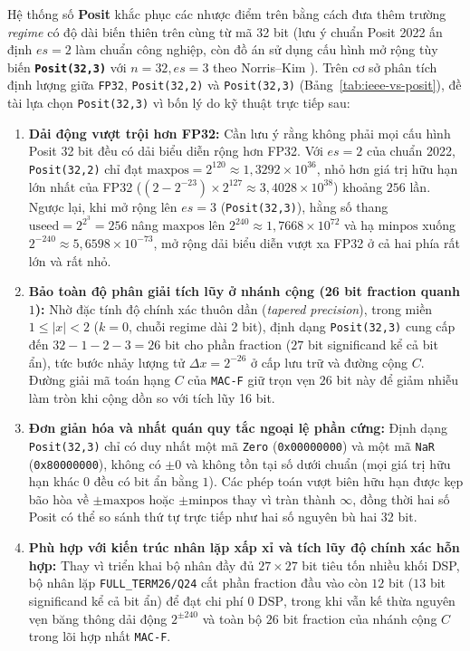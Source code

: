 Hệ thống số \textbf{Posit} \cite{gustafson2017posit,positstandard2022} khắc phục
các nhược điểm trên bằng cách đưa thêm trường \textit{regime} có độ dài biến thiên
trên cùng từ mã 32 bit (lưu ý chuẩn Posit 2022 ấn định $es=2$ làm chuẩn công
nghiệp, còn đồ án sử dụng cấu hình mở rộng tùy biến \textbf{\texttt{Posit(32,3)}}
với $n=32, es=3$ theo Norris--Kim \cite{norris2021iterativeposit}). Trên cơ sở
phân tích định lượng giữa \texttt{FP32}, \texttt{Posit(32,2)} và \texttt{Posit(32,3)}
(Bảng~\ref{tab:ieee-vs-posit}), đề tài lựa chọn \texttt{Posit(32,3)} vì bốn lý do
kỹ thuật trực tiếp sau:
\begin{enumerate}
  \item \textbf{Dải động vượt trội hơn FP32:} Cần lưu ý rằng không phải mọi cấu
        hình Posit 32 bit đều có dải biểu diễn rộng hơn FP32. Với $es=2$ của
        chuẩn 2022, \texttt{Posit(32,2)} chỉ đạt $\mathrm{maxpos}=2^{120}\approx
        1{,}3292\times 10^{36}$, nhỏ hơn giá trị hữu hạn lớn nhất của FP32
        ($(2-2^{-23})\times 2^{127}\approx 3{,}4028\times 10^{38}$) khoảng $256$ lần.
        Ngược lại, khi mở rộng lên $es=3$ (\texttt{Posit(32,3)}), hằng số thang
        $\mathrm{useed}=2^{2^3}=256$ nâng $\mathrm{maxpos}$ lên $2^{240}\approx
        1{,}7668\times 10^{72}$ và hạ $\mathrm{minpos}$ xuống $2^{-240}\approx
        5{,}6598\times 10^{-73}$, mở rộng dải biểu diễn vượt xa FP32 ở cả hai
        phía rất lớn và rất nhỏ.
  \item \textbf{Bảo toàn độ phân giải tích lũy ở nhánh cộng (26 bit fraction quanh $1$):}
        Nhờ đặc tính độ chính xác thuôn dần (\textit{tapered precision}), trong
        miền $1 \le |x| < 2$ ($k=0$, chuỗi regime dài 2 bit), định dạng
        \texttt{Posit(32,3)} cung cấp đến $32 - 1 - 2 - 3 = 26$ bit cho phần
        fraction ($27$ bit significand kể cả bit ẩn), tức bước nhảy lượng tử
        $\Delta x = 2^{-26}$ ở cấp lưu trữ và đường cộng $C$. Đường giải mã
        toán hạng $C$ của \texttt{MAC-F} giữ trọn vẹn $26$ bit này để giảm
        nhiễu làm tròn khi cộng dồn so với tích lũy 16 bit.
  \item \textbf{Đơn giản hóa và nhất quán quy tắc ngoại lệ phần cứng:} Định dạng
        \texttt{Posit(32,3)} chỉ có duy nhất một mã \texttt{Zero} (\texttt{0x00000000})
        và một mã \texttt{NaR} (\texttt{0x80000000}), không có $\pm 0$ và không
        tồn tại số dưới chuẩn (mọi giá trị hữu hạn khác $0$ đều có bit ẩn bằng $1$).
        Các phép toán vượt biên hữu hạn được kẹp bão hòa về $\pm\mathrm{maxpos}$
        hoặc $\pm\mathrm{minpos}$ thay vì tràn thành $\infty$, đồng thời hai số
        Posit có thể so sánh thứ tự trực tiếp như hai số nguyên bù hai 32 bit.
  \item \textbf{Phù hợp với kiến trúc nhân lặp xấp xỉ và tích lũy độ chính xác hỗn hợp:}
        Thay vì triển khai bộ nhân đầy đủ $27\times 27$ bit tiêu tốn nhiều khối DSP,
        bộ nhân lặp \texttt{FULL\_TERM26/Q24} cắt phần fraction đầu vào còn
        $12$ bit ($13$ bit significand kể cả bit ẩn) để đạt chi phí $0\text{ DSP}$,
        trong khi vẫn kế thừa nguyên vẹn băng thông dải động $2^{\pm 240}$ và
        toàn bộ $26$ bit fraction của nhánh cộng $C$ trong lõi hợp nhất \texttt{MAC-F}.
\end{enumerate}

